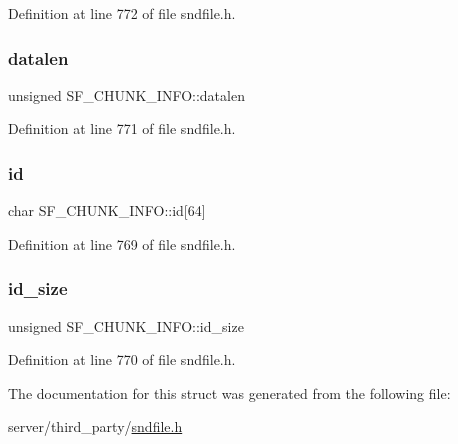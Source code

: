 Definition at line 772 of file sndfile.\+h.

\mbox{\label{struct_s_f___c_h_u_n_k___i_n_f_o_a82ed11e618cd236142f6b57435ebd279}} 
\subsubsection{\texorpdfstring{datalen}{datalen}}
{\footnotesize\ttfamily unsigned S\+F\+\_\+\+C\+H\+U\+N\+K\+\_\+\+I\+N\+F\+O\+::datalen}



Definition at line 771 of file sndfile.\+h.

\mbox{\label{struct_s_f___c_h_u_n_k___i_n_f_o_afedf0986b689c3962843160d15acdad6}} 
\subsubsection{\texorpdfstring{id}{id}}
{\footnotesize\ttfamily char S\+F\+\_\+\+C\+H\+U\+N\+K\+\_\+\+I\+N\+F\+O\+::id\mbox{[}64\mbox{]}}



Definition at line 769 of file sndfile.\+h.

\mbox{\label{struct_s_f___c_h_u_n_k___i_n_f_o_afa2490bdb8ac85fc207ef938a8c4a03d}} 
\subsubsection{\texorpdfstring{id\_size}{id\_size}}
{\footnotesize\ttfamily unsigned S\+F\+\_\+\+C\+H\+U\+N\+K\+\_\+\+I\+N\+F\+O\+::id\+\_\+size}



Definition at line 770 of file sndfile.\+h.



The documentation for this struct was generated from the following file\+:\begin{DoxyCompactItemize}
\item 
server/third\+\_\+party/\mbox{\hyperlink{sndfile_8h}{sndfile.\+h}}\end{DoxyCompactItemize}
